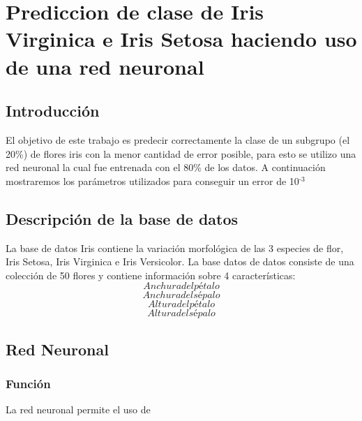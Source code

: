\documentclass[11pt]{article}
\date{\today}
\title{}
\begin{document}
\tableofcontents

\section{Prediccion de clase de Iris Virginica e Iris Setosa haciendo uso de una red neuronal}
\label{sec:orgaf12cb4}

\subsection{Introducción}
\label{sec:org6d27da3}
El objetivo de este trabajo es predecir correctamente la clase de un subgrupo (el 20\%) de flores iris con la menor cantidad de error posible, para esto se utilizo una red neuronal la cual fue entrenada con el 80\% de los datos. A continuación mostraremos los parámetros utilizados para conseguir un error de 10\(^{\text{-3}}\)

\subsection{Descripción de la base de datos}
\label{sec:org652ef46}
La base de datos Iris contiene la variación morfológica de las 3 especies de flor, Iris Setosa, Iris Virginica e Iris Versicolor. La base datos de datos consiste de una colección de 50 flores y contiene información sobre 4 características:
\begin{equation}
Anchura del pétalo
\end{equation}
\begin{equation}
Anchura del sépalo
\end{equation}
\begin{equation}
Altura del pétalo
\end{equation}
\begin{equation}
Altura del sépalo
\end{equation}

\subsection{Red Neuronal}
\label{sec:orgec229dc}
\subsubsection{Función}
\label{sec:org6d11709}
La red neuronal permite el uso de
\end{document}
